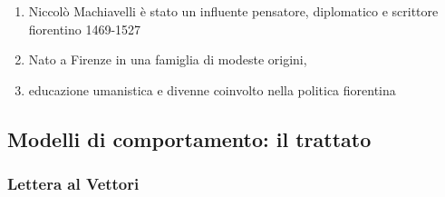 \documentclass{article}
\begin{document}
\begin{enumerate}
    \item Niccolò Machiavelli è stato un influente pensatore, diplomatico e scrittore fiorentino 1469-1527
    \item Nato a Firenze in una famiglia di modeste origini,
    \item educazione umanistica e divenne coinvolto nella politica fiorentina
\end{enumerate}

\subsection{Modelli di comportamento: il trattato}
\subsubsection{Lettera al Vettori}
\end{document}
